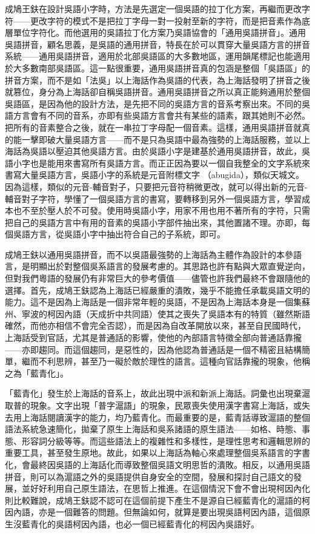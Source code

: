 \documentclass[a5paper, 12pt, openany]{book} %
\begin{document}
成鳩王鈇在設計吳語小字時，方法是先選定一個吳語的拉丁化方案，再繼而更改字符——更改字符的模式不是把拉丁字母一對一投射至新的字符，而是把音素作為底層單位字符化。而他選用的吳語拉丁化方案乃吳語協會的「通用吳語拼音」。通用吳語拼音，顧名思義，是吳語的通用拼音，特長在於可以貫穿大量吳語方言的拼音系統——通用吳語拼音，適用於北部吳語區的大多數地區，運用韻尾標記也能適用於大多數南部吳語區。這一點很重要，通用吳語拼音真的包涵是整個「吳語區」的拼音方案，而不是如「法吳」以上海話作為吳語的代表，為上海話發明了拼音之後就篡位，身分為上海話卻自稱吳語拼音。通用吳語拼音之所以真正能夠通用於整個吳語區，是因為他的設計方法，是先把不同的吳語方言的音系考察出來。不同的吳語方言會有不同的音系，亦即有些吳語方言會共有某些的語素，跟其她則不必然。把所有的音素整合之後，就在一串拉丁字母配一個音素。這樣，通用吳語拼音就真的能一擊即破大量吳語方言——而不是只為吳語中最為強勢的上海話服務，並以上海話為吳語以壓迫其他吳語方言。由於吳語小字是建基於通用吳語拼音，故此，吳語小字也是能用來書寫所有吳語方言。而正正因為要以一個自我整全的文字系統來書寫大量吳語方言，吳語小字的系統是元音附標文字 （abugida），類似天城文。因為這樣，類似的元音-輔音對子，只要把元音符稍微更改，就可以得出新的元音-輔音對子字符，學懂了一個吳語方言的書寫，要轉移到另外一個吳語方言，學習成本也不至於壓人於不可發。使用時吳語小字，用家不用也用不著所有的字符，只需把自己的吳語方言中有用的音素的吳語小字部件抽出來，其他置諸不理。亦即，每個吳語方言，從吳語小字中抽出符合自己的子系統，即可。

成鳩王鈇以通用吳語拼音，而不以吳語最強勢的上海話為主體作為設計的本參語言，是明顯出於對整個吳系語言的發展考慮的。其思路也許有點與大眾直覺逆向，但對我們粵語的發展仍有非常巨大的參考價值——儘管也許我們最終不會跟隨他的選擇。首先，成鳩王鈇認為上海話已經嚴重的潰敗，幾乎不能擔任承載吳語文明的能力。這不是因為上海話是一個非常年輕的吳語，不是因為上海話本身是一個集蘇州、寧波的柯因內語（天成折中共同語）使其之喪失了吳語本有的特質（雖然斯語確然，而他亦相信不會完全否認），而是因為自改革開放以來，甚至自民國時代，上海話受到官話，尤其是普通話的影響，使他的內部語言特徵全部向普通話靠攏——亦即趨同。而這個趨同，是惡性的，因為他認為普通話是一個不精密且結構簡單，繼而不利思辨，甚至乃一礙於敵於理性的語言。這種向官話靠攏的現象，他稱之為「藍青化」。

「藍青化」發生於上海話的音系上，故此出現中派和新派上海話。詞彙也出現棄滬取普的現象。文字出現「普字滬語」的現象，民眾喪失使用漢字書寫上海話，或失去用上海話閱讀漢字的能力，均乃藍青化。而最重要的是，藍青話導致滬語的整個語法系統急速簡化，拋棄了原生上海話和吳系諸語的原生語法——如格、時態、事態、形容詞分級等等。而這些語法上的複雜性和多樣性，是理性思考和邏輯思辨的重要工具，甚至發生原地。故此，如果以上海話為軸心來處理整個吳系語言的字書化，會最終因吳語的上海話化而導致整個吳語文明思哲的潰敗。相反，以通用吳語拼音，則可以為滬語之外的吳語提供自身安全的空間，發展和探討自己語文的發展，並好好利用自己原生語法，在思哲上推進。在這個情況下會不會出現柯因內化則比較難說，成鳩王鈇認不認可在這個前提下產生不是源自已經藍青化的滬語的柯因內語，亦是一個難答的問題。但無論如何，就算是要出現吳語柯因內語，這個原生沒藍青化的吳語柯因內語，也必一個已經藍青化的柯因內吳語好。
\end{document}
